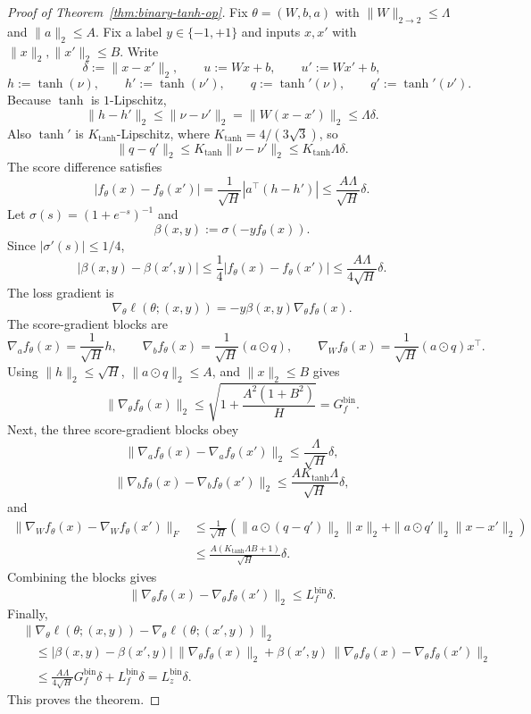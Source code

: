 \documentclass[conference,compsoc]{IEEEtran}
\begin{document}
\begin{proof}[Proof of Theorem~\ref{thm:binary-tanh-op}]
Fix $\theta=(W,b,a)$ with $\|W\|_{2\to2}\le\Lambda$ and $\|a\|_2\le A$. Fix a label $y\in\{-1,+1\}$ and inputs $x,x'$ with $\|x\|_2,\|x'\|_2\le B$. Write
\[
\delta:=\|x-x'\|_2,
\qquad
u:=Wx+b,
\qquad
u':=Wx'+b,
\]
\[
h:=\tanh(\nu),
\qquad
h':=\tanh(\nu'),
\qquad
q:=\tanh'(\nu),
\qquad
q':=\tanh'(\nu').
\]
Because $\tanh$ is $1$-Lipschitz,
\[
\|h-h'\|_2\le\|\nu-\nu'\|_2=\|W(x-x')\|_2\le\Lambda\delta.
\]
Also $\tanh'$ is $K_{\tanh}$-Lipschitz, where $K_{\tanh}=4/(3\sqrt3)$, so
\[
\|q-q'\|_2\le K_{\tanh}\|\nu-\nu'\|_2\le K_{\tanh}\Lambda\delta.
\]
The score difference satisfies
\[
|f_\theta(x)-f_\theta(x')|
=\frac1{\sqrt H}|a^\top(h-h')|
\le\frac{A\Lambda}{\sqrt H}\delta.
\]
Let $\sigma(s)=(1+e^{-s})^{-1}$ and
\[
\beta(x,y):=\sigma(-y f_\theta(x)).
\]
Since $|\sigma'(s)|\le1/4$,
\[
|\beta(x,y)-\beta(x',y)|
\le\frac14|f_\theta(x)-f_\theta(x')|
\le\frac{A\Lambda}{4\sqrt H}\delta.
\]
The loss gradient is
\[
\nabla_\theta\ell(\theta;(x,y))=-y\beta(x,y)\nabla_\theta f_\theta(x).
\]
The score-gradient blocks are
\[
\nabla_a f_\theta(x)=\frac1{\sqrt H}h,
\qquad
\nabla_b f_\theta(x)=\frac1{\sqrt H}(a\odot q),
\qquad
\nabla_W f_\theta(x)=\frac1{\sqrt H}(a\odot q)x^\top.
\]
Using $\|h\|_2\le\sqrt H$, $\|a\odot q\|_2\le A$, and $\|x\|_2\le B$ gives
\[
\|\nabla_\theta f_\theta(x)\|_2
\le
\sqrt{1+\frac{A^2(1+B^2)}{H}}
=G_f^{\mathrm{bin}}.
\]
Next, the three score-gradient blocks obey
\[
\|\nabla_a f_\theta(x)-\nabla_a f_\theta(x')\|_2
\le\frac{\Lambda}{\sqrt H}\delta,
\]
\[
\|\nabla_b f_\theta(x)-\nabla_b f_\theta(x')\|_2
\le\frac{AK_{\tanh}\Lambda}{\sqrt H}\delta,
\]
and
\[
\begin{aligned}
\|\nabla_W f_\theta(x)-\nabla_W f_\theta(x')\|_F
&\le\frac1{\sqrt H}\left(
\|a\odot(q-q')\|_2\|x\|_2+
\|a\odot q'\|_2\|x-x'\|_2
\right)\\
&\le\frac{A(K_{\tanh}\Lambda B+1)}{\sqrt H}\delta.
\end{aligned}
\]
Combining the blocks gives
\[
\|\nabla_\theta f_\theta(x)-\nabla_\theta f_\theta(x')\|_2
\le L_f^{\mathrm{bin}}\delta.
\]
Finally,
\[
\begin{aligned}
&\|\nabla_\theta\ell(\theta;(x,y))-\nabla_\theta\ell(\theta;(x',y))\|_2\\
&\quad\le
|\beta(x,y)-\beta(x',y)|\,\|\nabla_\theta f_\theta(x)\|_2
+\beta(x',y)\,\|\nabla_\theta f_\theta(x)-\nabla_\theta f_\theta(x')\|_2\\
&\quad\le
\frac{A\Lambda}{4\sqrt H}G_f^{\mathrm{bin}}\delta+L_f^{\mathrm{bin}}\delta
=L_z^{\mathrm{bin}}\delta.
\end{aligned}
\]
This proves the theorem.
\end{proof}
\end{document}

